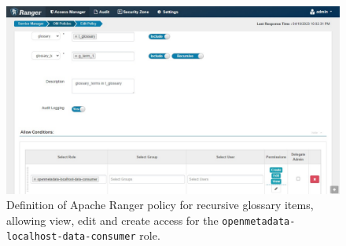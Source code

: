 \begin{figure}
    \centering
    \includegraphics[width=\textwidth]{chapters/appendix/figures/exp/4/ranger_poli.pdf}
    \caption{Definition of Apache Ranger policy for recursive glossary items, allowing view, edit and create access for the \texttt{openmetadata-localhost-data-consumer} role.}
    \label{fig:exp_4_ranger}
\end{figure}
